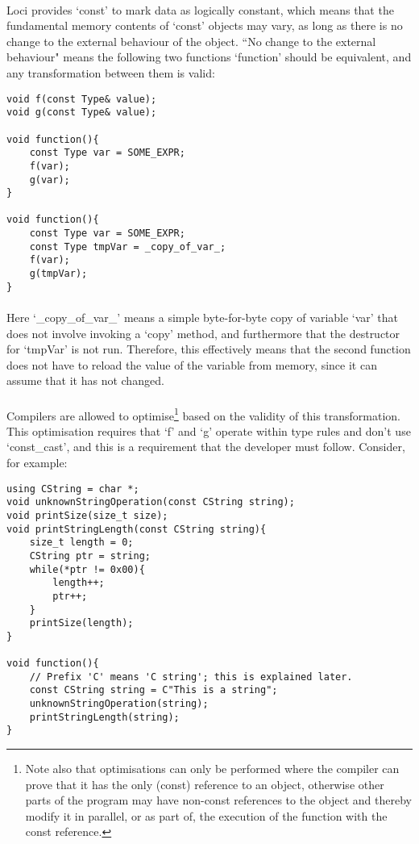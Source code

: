 \documentclass[12pt,twoside,notitlepage]{report}
\begin{document}
\paragraph{}
Loci provides `const' to mark data as logically constant, which means that the fundamental memory contents of `const' objects may vary, as long as there is no change to the external behaviour of the object. ``No change to the external behaviour" means the following two functions `function' should be equivalent, and any transformation between them is valid:

\begin{lstlisting}
void f(const Type& value);
void g(const Type& value);

void function(){
	const Type var = SOME_EXPR;
	f(var);
	g(var);
}

void function(){
	const Type var = SOME_EXPR;
	const Type tmpVar = _copy_of_var_;
	f(var);
	g(tmpVar);
}
\end{lstlisting}

\paragraph{}
Here `\_copy\_of\_var\_' means a simple byte-for-byte copy of variable `var' that does not involve invoking a `copy' method, and furthermore that the destructor for `tmpVar' is not run. Therefore, this effectively means that the second function does not have to reload the value of the variable from memory, since it can assume that it has not changed.

\paragraph{}
Compilers are allowed to optimise\footnote{Note also that optimisations can only be performed where the compiler can prove that it has the only (const) reference to an object, otherwise other parts of the program may have non-const references to the object and thereby modify it in parallel, or as part of, the execution of the function with the const reference.} based on the validity of this transformation. This optimisation requires that `f' and `g' operate within type rules and don't use `const\_cast', and this is a requirement that the developer must follow. Consider, for example:

\begin{lstlisting}
using CString = char *;
void unknownStringOperation(const CString string);
void printSize(size_t size);
void printStringLength(const CString string){
	size_t length = 0;
	CString ptr = string;
	while(*ptr != 0x00){
		length++;
		ptr++;
	}
	printSize(length);
}

void function(){
	// Prefix 'C' means 'C string'; this is explained later.
	const CString string = C"This is a string";
	unknownStringOperation(string);
	printStringLength(string);
}
\end{lstlisting}
\end{document}
